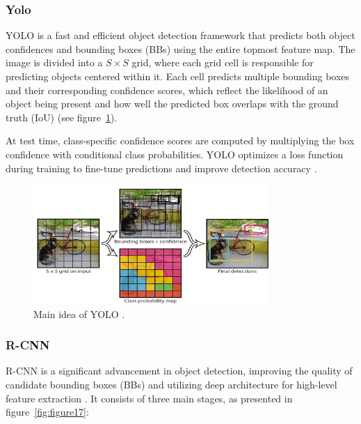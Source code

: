 \subsubsection{Yolo}
YOLO is a fast and efficient object detection framework that predicts both object confidences and bounding boxes (BBs) using the entire topmost feature map. The image is divided into a $S \times S$ grid, where each grid cell is responsible for predicting objects centered within it. Each cell predicts multiple bounding boxes and their corresponding confidence scores, which reflect the likelihood of an object being present and how well the predicted box overlaps with the ground truth (IoU) (see figure~\ref{fig:figure16}).

At test time, class-specific confidence scores are computed by multiplying the box confidence with conditional class probabilities. YOLO optimizes a loss function during training to fine-tune predictions and improve detection accuracy \parencite{zhao2019objectdetection}.

\begin{figure}[H] %
    \centering
    \includegraphics[width=0.8\textwidth]{chapters/chapter1/images/Figure16.png}
    \caption{Main idea of YOLO \parencite{zhao2019objectdetection}.}
    \label{fig:figure16}
\end{figure}

\subsubsection{R-CNN}
R-CNN is a significant advancement in object detection, improving the quality of candidate bounding boxes (BBs) and utilizing deep architecture for high-level feature extraction \parencite{zhao2019objectdetection}. It consists of three main stages, as presented in figure~\ref{fig:figure17}:

